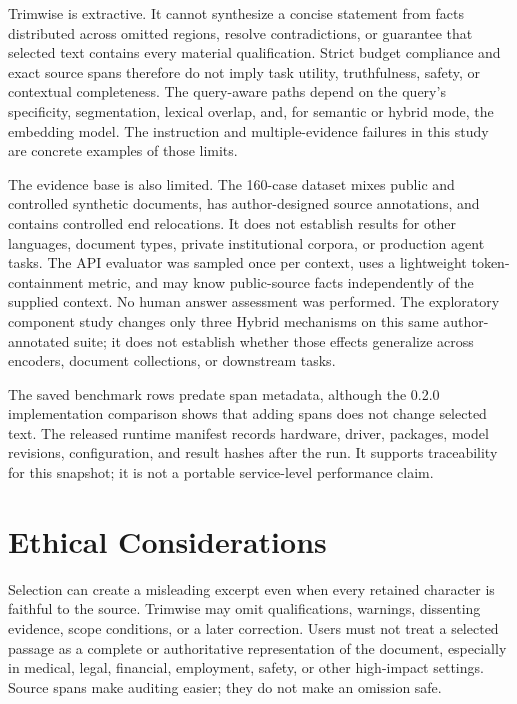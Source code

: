 \documentclass[
]{article}
\begin{document}
Trimwise is extractive. It cannot synthesize a concise statement from
facts distributed across omitted regions, resolve contradictions, or
guarantee that selected text contains every material qualification.
Strict budget compliance and exact source spans therefore do not imply
task utility, truthfulness, safety, or contextual completeness. The
query-aware paths depend on the query's specificity, segmentation,
lexical overlap, and, for semantic or hybrid mode, the embedding model.
The instruction and multiple-evidence failures in this study are
concrete examples of those limits.

The evidence base is also limited. The 160-case dataset mixes public and
controlled synthetic documents, has author-designed source annotations,
and contains controlled end relocations. It does not establish results
for other languages, document types, private institutional corpora, or
production agent tasks. The API evaluator was sampled once per context,
uses a lightweight token-containment metric, and may know public-source
facts independently of the supplied context. No human answer assessment
was performed. The exploratory component study changes only three Hybrid
mechanisms on this same author-annotated suite; it does not establish whether
those effects generalize across encoders, document collections, or downstream
tasks.

The saved benchmark rows predate span metadata, although the 0.2.0
implementation comparison shows that adding spans does not change
selected text. The released runtime manifest records hardware, driver,
packages, model revisions, configuration, and result hashes after the
run. It supports traceability for this snapshot; it is not a portable
service-level performance claim.

\section{Ethical Considerations}\label{ethical-considerations}

Selection can create a misleading excerpt even when every retained
character is faithful to the source. Trimwise may omit qualifications,
warnings, dissenting evidence, scope conditions, or a later correction.
Users must not treat a selected passage as a complete or authoritative
representation of the document, especially in medical, legal, financial,
employment, safety, or other high-impact settings. Source spans make
auditing easier; they do not make an omission safe.
\end{document}
